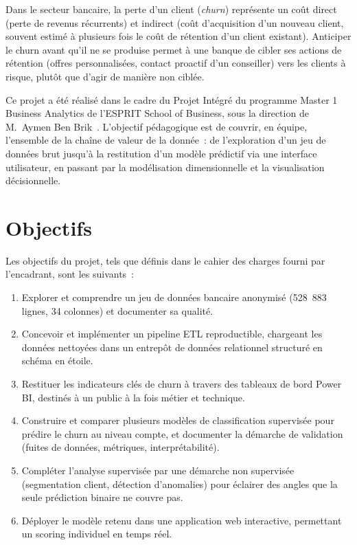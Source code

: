 \documentclass[11pt,a4paper]{report}
\begin{document}
Dans le secteur bancaire, la perte d'un client (\emph{churn}) repr\'esente un
co\^ut direct (perte de revenus r\'ecurrents) et indirect (co\^ut d'acquisition
d'un nouveau client, souvent estim\'e \`a plusieurs fois le co\^ut de r\'etention
d'un client existant). Anticiper le churn avant qu'il ne se produise permet
\`a une banque de cibler ses actions de r\'etention (offres personnalis\'ees,
contact proactif d'un conseiller) vers les clients \`a risque, plut\^ot que
d'agir de mani\`ere non cibl\'ee.

Ce projet a \'et\'e r\'ealis\'e dans le cadre du Projet Int\'egr\'e du programme
Master 1 Business Analytics de l'ESPRIT School of Business, sous la direction
de M.~Aymen Ben Brik~\citep{benbrik2026cours}. L'objectif p\'edagogique est de
couvrir, en \'equipe, l'ensemble de la cha\^ine de valeur de la donn\'ee~: de
l'exploration d'un jeu de donn\'ees brut jusqu'\`a la restitution d'un mod\`ele
pr\'edictif via une interface utilisateur, en passant par la mod\'elisation
dimensionnelle et la visualisation d\'ecisionnelle.

\section{Objectifs}

Les objectifs du projet, tels que d\'efinis dans le cahier des charges fourni
par l'encadrant, sont les suivants~:

\begin{enumerate}
\item Explorer et comprendre un jeu de donn\'ees bancaire anonymis\'e
      (528~883 lignes, 34 colonnes) et documenter sa qualit\'e.
\item Concevoir et impl\'ementer un pipeline ETL reproductible, chargeant les
      donn\'ees nettoy\'ees dans un entrep\^ot de donn\'ees relationnel structur\'e
      en sch\'ema en \'etoile.
\item Restituer les indicateurs cl\'es de churn \`a travers des tableaux de
      bord Power BI, destin\'es \`a un public \`a la fois m\'etier et technique.
\item Construire et comparer plusieurs mod\`eles de classification supervis\'ee
      pour pr\'edire le churn au niveau compte, et documenter la d\'emarche de
      validation (fuites de donn\'ees, m\'etriques, interpr\'etabilit\'e).
\item Compl\'eter l'analyse supervis\'ee par une d\'emarche non supervis\'ee
      (segmentation client, d\'etection d'anomalies) pour \'eclairer des angles
      que la seule pr\'ediction binaire ne couvre pas.
\item D\'eployer le mod\`ele retenu dans une application web interactive,
      permettant un scoring individuel en temps r\'eel.
\end{enumerate}
\end{document}
